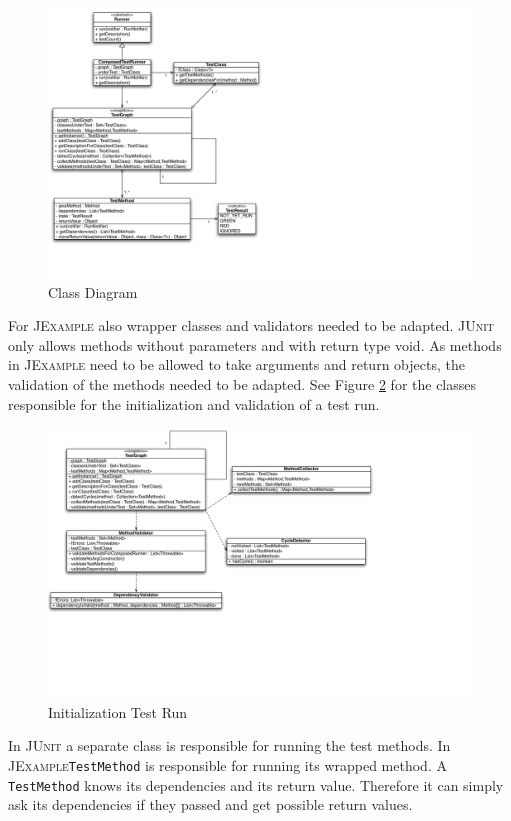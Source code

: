 \documentclass[11pt,a4paper,pdftex]{article}
\newcommand{\JUnit}{\textsc{JUnit}\xspace}
\newcommand{\JExample}{\textsc{JExample}\xspace}
\begin{document}
\begin{figure}[htbp]
 \includegraphics[width=24.0cm]{classdiagram.pdf}
 \caption{Class Diagram}
 \label{fig:classDiag}
\end{figure}

For \JExample also wrapper classes and validators needed to be adapted. \JUnit only allows methods without parameters and with return type void. As methods in \JExample need to be allowed to take arguments and return objects, the validation of the methods needed to be adapted. See Figure \ref{fig:classDiagInit} for the classes responsible for the initialization and validation of a test run.

\begin{figure}[htbp]
 \includegraphics[width=20.0cm]{classdiagramInit.pdf}
 \caption{Initialization Test Run}
 \label{fig:classDiagInit}
\end{figure}

In \JUnit a separate class is responsible for running the test methods. In \JExample \verb|TestMethod| is responsible for running its wrapped method. A \verb|TestMethod| knows its dependencies and its return value. Therefore it can simply ask its dependencies if they passed and get possible return values.
\end{document}
